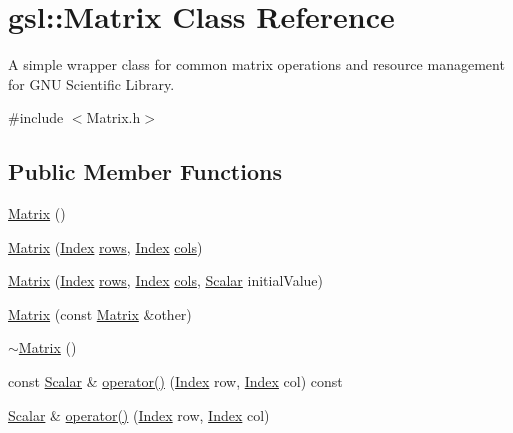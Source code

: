 \hypertarget{classgsl_1_1_matrix}{\section{gsl\+:\+:Matrix Class Reference}
\label{classgsl_1_1_matrix}
}


A simple wrapper class for common matrix operations and resource management for G\+N\+U Scientific Library.  




{\ttfamily \#include $<$Matrix.\+h$>$}

\subsection*{Public Member Functions}
\begin{DoxyCompactItemize}
\item 
\hyperlink{classgsl_1_1_matrix_a356b049336e124fa680bec4d6f413b0a}{Matrix} ()
\item 
\hyperlink{classgsl_1_1_matrix_a9b4fca307f0738b821a75a36ad88fd1b}{Matrix} (\hyperlink{typedefs_8h_a5d7deb06d9443e7d4a47bf078638cc91}{Index} \hyperlink{classgsl_1_1_matrix_a459c986967f558d242020a7d6c5feb0b}{rows}, \hyperlink{typedefs_8h_a5d7deb06d9443e7d4a47bf078638cc91}{Index} \hyperlink{classgsl_1_1_matrix_a19034005cec347cd9e3879c06f59b4eb}{cols})
\item 
\hyperlink{classgsl_1_1_matrix_a32251de3e652c6099966d588175018c8}{Matrix} (\hyperlink{typedefs_8h_a5d7deb06d9443e7d4a47bf078638cc91}{Index} \hyperlink{classgsl_1_1_matrix_a459c986967f558d242020a7d6c5feb0b}{rows}, \hyperlink{typedefs_8h_a5d7deb06d9443e7d4a47bf078638cc91}{Index} \hyperlink{classgsl_1_1_matrix_a19034005cec347cd9e3879c06f59b4eb}{cols}, \hyperlink{typedefs_8h_a508fc58b5dc3c81865305f6498457063}{Scalar} initial\+Value)
\item 
\hyperlink{classgsl_1_1_matrix_aa0d577050c24af22cabee26a13d16e8c}{Matrix} (const \hyperlink{classgsl_1_1_matrix}{Matrix} \&other)
\item 
\hyperlink{classgsl_1_1_matrix_ab9e524d34343fd4f2319461d9a34008d}{$\sim$\+Matrix} ()
\item 
const \hyperlink{typedefs_8h_a508fc58b5dc3c81865305f6498457063}{Scalar} \& \hyperlink{classgsl_1_1_matrix_a06ef292d80279226aa374bef62b43dac}{operator()} (\hyperlink{typedefs_8h_a5d7deb06d9443e7d4a47bf078638cc91}{Index} row, \hyperlink{typedefs_8h_a5d7deb06d9443e7d4a47bf078638cc91}{Index} col) const 
\item 
\hyperlink{typedefs_8h_a508fc58b5dc3c81865305f6498457063}{Scalar} \& \hyperlink{classgsl_1_1_matrix_a7bcbc84fed0a2562dfe054117d700ab3}{operator()} (\hyperlink{typedefs_8h_a5d7deb06d9443e7d4a47bf078638cc91}{Index} row, \hyperlink{typedefs_8h_a5d7deb06d9443e7d4a47bf078638cc91}{Index} col)

\end{DoxyCompactItemize}
